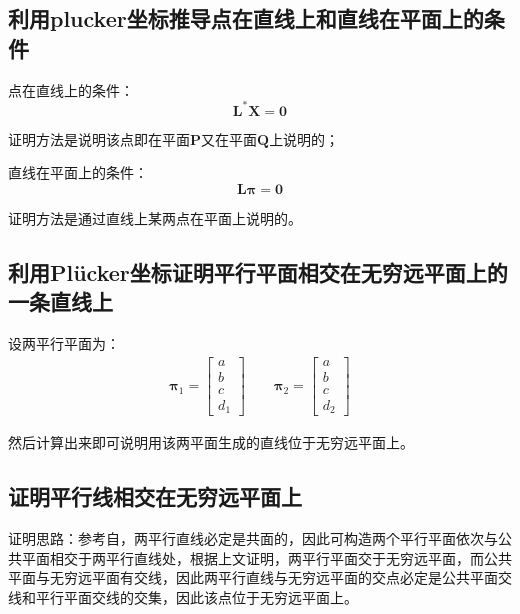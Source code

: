 \documentclass[11pt]{article}
\begin{document}
\subsection{利用plucker坐标推导点在直线上和直线在平面上的条件}
点在直线上的条件：
\begin{equation*}
  \mathbf{L^*X}=\mathbf{0}
\end{equation*}\par
证明方法是说明该点即在平面$\mathbf{P}$又在平面$\mathbf{Q}$上说明的；\par
直线在平面上的条件：
\begin{equation*}
  \mathbold{L\pi}=\mathbf{0}
\end{equation*}\par
证明方法是通过直线上某两点在平面上说明的。
\subsection{利用Plücker坐标证明平行平面相交在无穷远平面上的一条直线上}
设两平行平面为：
\begin{align*}
  \mathbold{\pi}_1=\begin{bmatrix}
                     a \\b\\c\\d_1
                   \end{bmatrix}\qquad\mathbold{\pi}_2=\begin{bmatrix}
                                                         a \\b\\c\\d_2
                                                       \end{bmatrix}
\end{align*}\par
然后计算出来即可说明用该两平面生成的直线位于无穷远平面上。
\subsection{证明平行线相交在无穷远平面上}
证明思路：参考自\cite{MultipleViewGeometrya}，两平行直线必定是共面的，因此可构造两个平行平面依次与公共平面相交于两平行直线处，根据上文证明，两平行平面交于无穷远平面，而公共平面与无穷远平面有交线，因此两平行直线与无穷远平面的交点必定是公共平面交线和平行平面交线的交集，因此该点位于无穷远平面上。
\end{document}
